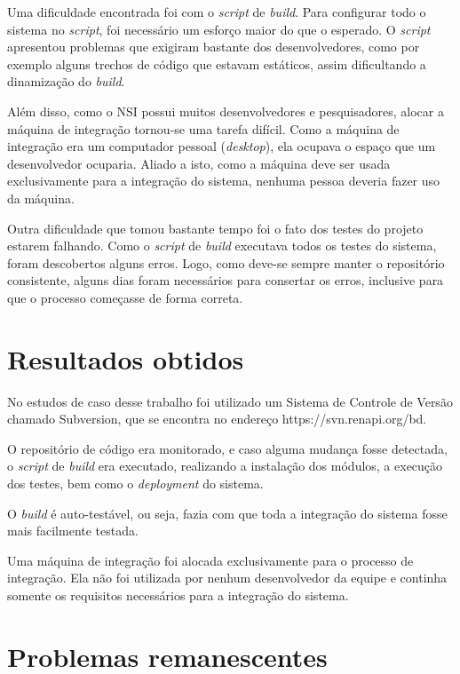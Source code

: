 Uma dificuldade encontrada foi com o \textit{script} de \textit{build}. Para configurar todo o sistema no \textit{script}, foi necessário um esforço maior do que o esperado. O \textit{script} apresentou problemas que exigiram bastante dos desenvolvedores, como por exemplo alguns trechos de código que estavam estáticos, assim dificultando a dinamização do \textit{build}.

Além disso, como o NSI possui muitos desenvolvedores e pesquisadores, alocar a máquina de integração tornou-se uma tarefa difícil. Como a máquina de integração era um computador pessoal (\textit{desktop}), ela ocupava o espaço que um desenvolvedor ocuparia. Aliado a isto, como a máquina deve ser usada exclusivamente para a integração do sistema, nenhuma pessoa deveria fazer uso da máquina.

Outra dificuldade que tomou bastante tempo foi o fato dos testes do projeto estarem falhando. Como o \textit{script} de \textit{build} executava todos os testes do sistema, foram descobertos alguns erros. Logo, como deve-se sempre manter o repositório consistente, alguns dias foram necessários para consertar os erros, inclusive para que o processo começasse de forma correta.

\section{Resultados obtidos}

No estudos de caso desse trabalho foi utilizado um Sistema de Controle de Versão chamado Subversion, que se encontra no endereço https://svn.renapi.org/bd.

O repositório de código era monitorado, e caso alguma mudança fosse detectada, o \textit{script} de \textit{build} era executado, realizando a instalação dos módulos, a execução dos testes, bem como o \textit{deployment} do sistema.

O \textit{build} é auto-testável, ou seja, fazia com que toda a integração do sistema fosse mais facilmente testada.

Uma máquina de integração foi alocada exclusivamente para o processo de integração. Ela não foi utilizada por nenhum desenvolvedor da equipe e continha somente os requisitos necessários para a integração do sistema.

\section{Problemas remanescentes}

